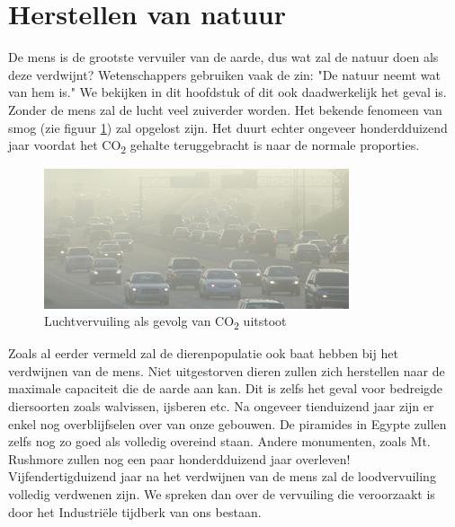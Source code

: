 \section{Herstellen van natuur}
De mens is de grootste vervuiler van de aarde, dus wat zal de natuur doen als deze verdwijnt? Wetenschappers gebruiken vaak de zin: "De natuur neemt wat van hem is." We bekijken in dit hoofdstuk of dit ook daadwerkelijk het geval is.
\newline
\newline
Zonder de mens zal de lucht veel zuiverder worden. Het bekende fenomeen van smog (zie figuur \ref{fig:smog}) zal opgelost zijn. Het duurt echter ongeveer honderdduizend jaar voordat het \texorpdfstring{CO\textsubscript{2}}{2} gehalte teruggebracht is naar de normale proporties. 
\begin{figure}[h]
	\centering
	\includegraphics[width=0.8\textwidth]{LuchtVervuiling.jpg}
	\caption{Luchtvervuiling als gevolg van \texorpdfstring{CO\textsubscript{2}}{2} uitstoot \cite{Pollution}}
	\label{fig:smog}
\end{figure}
\newline\newline
Zoals al eerder vermeld zal de dierenpopulatie ook baat hebben bij het verdwijnen van de mens. Niet uitgestorven dieren zullen zich herstellen naar de maximale capaciteit die de aarde aan kan. Dit is zelfs het geval voor bedreigde diersoorten zoals walvissen, ijsberen etc.
\newline\newline
Na ongeveer tienduizend jaar zijn er enkel nog overblijfselen over van onze gebouwen. De piramides in Egypte zullen zelfs nog zo goed als volledig overeind staan. Andere monumenten, zoals Mt. Rushmore zullen nog een paar honderdduizend jaar overleven!
\newline\newline
Vijfendertigduizend jaar na het verdwijnen van de mens zal de loodvervuiling volledig verdwenen zijn. We spreken dan over de vervuiling die veroorzaakt is door het Industri\"{e}le tijdberk van ons bestaan.

